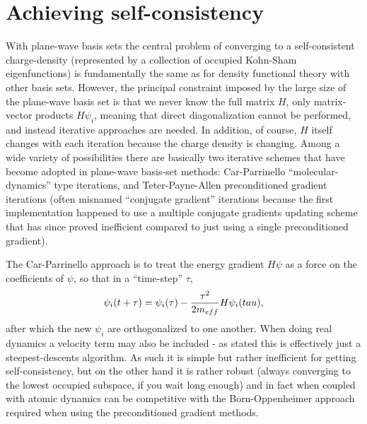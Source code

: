 \section{Achieving self-consistency}

With plane-wave basis sets the central problem of converging to
a self-consistent charge-density (represented by a collection of
occupied Kohn-Sham eigenfunctions) is fundamentally the same as for
density functional theory with other basis sets. However, the principal
constraint imposed by the large size of the plane-wave basis set is
that we never know the full matrix $H$, only matrix-vector products
$H \psi_i$, meaning that direct diagonalization cannot be performed,
and instead iterative approaches are needed. In addition, of course,
$H$ itself changes with each iteration because the charge density
is changing. Among a wide variety of possibilities there are basically
two iterative schemes that have become adopted in plane-wave basis-set
methods: Car-Parrinello ``molecular-dynamics'' type iterations, and
Teter-Payne-Allen preconditioned gradient iterations (often
misnamed ``conjugate gradient'' iterations because the first implementation
happened to use a multiple conjugate gradients updating scheme that
has since proved inefficient compared to just using a single preconditioned
gradient).

The Car-Parrinello approach is to treat the energy gradient $H\psi$ as
a force on the coefficients of $\psi$, so that in a ``time-step'' $\tau$,
\begin{equation}
\psi_i(t + \tau) = \psi_i(\tau) - {\tau^2 \over 2 m_{eff}} H\psi_i(tau),
\end{equation}
after which the new $\psi_i$ are orthogonalized to one another.
When doing real dynamics a velocity term may also be included - as stated
this is effectively just a steepest-descents algorithm. As such it
is simple but rather inefficient for getting self-consistency, but
on the other hand it is rather robust (always converging to the lowest
occupied subspace, if you wait long enough) and in fact when coupled
with atomic dynamics can be competitive with the Born-Oppenheimer
approach required when using the preconditioned gradient methods.

